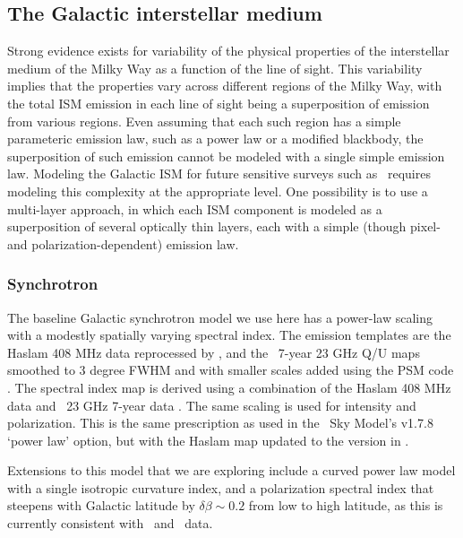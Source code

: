 
\subsection{The Galactic interstellar medium}

Strong evidence exists for variability of the physical properties of the interstellar medium of the Milky Way as a function of the line of sight. This variability implies that the properties vary across different regions of the Milky Way, with the total ISM emission in each line of sight being a superposition of emission from various regions. Even assuming that each such region has a simple parameteric emission law, such as a power law or a modified blackbody, the superposition of such emission cannot be modeled with a single simple emission law. Modeling the Galactic ISM for future sensitive surveys such as \cmbexp\ requires  modeling  this complexity at the appropriate level. One possibility is to use a multi-layer approach, in which each ISM component is modeled as a superposition of several optically thin layers, each with a simple (though pixel- and polarization-dependent) emission law.

\subsubsection{Synchrotron}

The baseline Galactic synchrotron model we use here has a power-law scaling with a modestly spatially varying spectral index.  The emission templates are the Haslam 408 MHz data reprocessed by \cite{Remazeilles:2015hpa}, 
and the \wmap\ 7-year 23 GHz Q/U maps \cite{Jarosik:2010iu}
smoothed to 3 degree FWHM and with smaller scales added using the PSM code \cite{Delabrouille:2012ye}.
The spectral index map is derived using a combination of the Haslam 
408 MHz data \cite{Haslam:1981aa} and \wmap\ 23 GHz 7-year data \cite{MivilleDeschenes:2008hn}.
The same scaling is used for intensity and polarization.  This is the same prescription as used in the \planck\ Sky Model's v1.7.8 `power law' option, but with the Haslam map updated to the version in \cite{Remazeilles:2015hpa}.

Extensions to this model that we are exploring include a curved power 
law model with a single isotropic curvature index, and a polarization spectral index that steepens with Galactic latitude by $\delta \beta \sim 0.2$ from low to high latitude, as this is currently consistent with \wmap\ and \planck\ data. 

